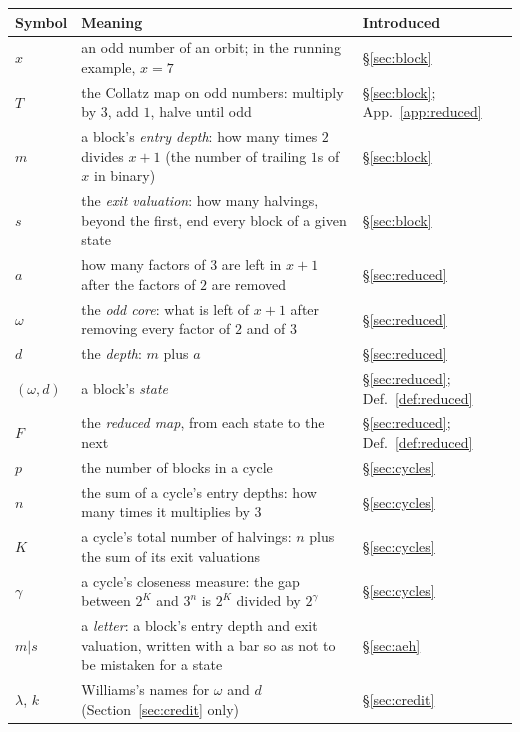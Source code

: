 \documentclass[11pt]{article}
\theoremstyle{remark}
\newcommand{\w}{\omega}
\begin{document}
\begin{center}
\begin{tabular}{>{\raggedright\arraybackslash}p{}>{\raggedright\arraybackslash}p{}>{\raggedright\arraybackslash}p{}}
\hline
Symbol & Meaning & Introduced \\
\hline
$x$ & an odd number of an orbit; in the running example, $x = 7$ & \S\ref{sec:block} \\
$T$ & the Collatz map on odd numbers: multiply by $3$, add $1$, halve until odd & \S\ref{sec:block}; App.~\ref{app:reduced} \\
$m$ & a block's \emph{entry depth}: how many times $2$ divides $x+1$ (the number of trailing $1$s of $x$ in binary) & \S\ref{sec:block} \\
$s$ & the \emph{exit valuation}: how many halvings, beyond the first, end every block of a given state & \S\ref{sec:block} \\
$a$ & how many factors of $3$ are left in $x+1$ after the factors of $2$ are removed & \S\ref{sec:reduced} \\
$\w$ & the \emph{odd core}: what is left of $x+1$ after removing every factor of $2$ and of $3$ & \S\ref{sec:reduced} \\
$d$ & the \emph{depth}: $m$ plus $a$ & \S\ref{sec:reduced} \\
$(\w,d)$ & a block's \emph{state} & \S\ref{sec:reduced}; Def.~\ref{def:reduced} \\
$F$ & the \emph{reduced map}, from each state to the next & \S\ref{sec:reduced}; Def.~\ref{def:reduced} \\
$p$ & the number of blocks in a cycle & \S\ref{sec:cycles} \\
$n$ & the sum of a cycle's entry depths: how many times it multiplies by $3$ & \S\ref{sec:cycles} \\
$K$ & a cycle's total number of halvings: $n$ plus the sum of its exit valuations & \S\ref{sec:cycles} \\
$\gamma$ & a cycle's closeness measure: the gap between $2^K$ and $3^n$ is $2^K$ divided by $2^{\gamma}$ & \S\ref{sec:cycles} \\
$m|s$ & a \emph{letter}: a block's entry depth and exit valuation, written with a bar so as not to be mistaken for a state & \S\ref{sec:aeh} \\
$\lambda$, $k$ & Williams's names for $\w$ and $d$ (Section~\ref{sec:credit} only) & \S\ref{sec:credit} \\
\hline
\end{tabular}
\end{center}
\end{document}
